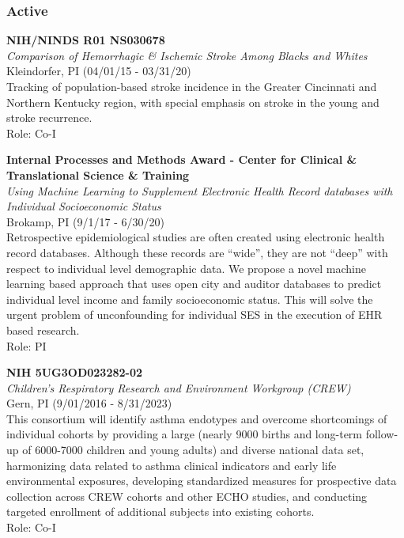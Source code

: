 \hypertarget{active}{%
\subsubsection{Active}\label{active}}

\textbf{NIH/NINDS R01 NS030678}\\
\emph{Comparison of Hemorrhagic \& Ischemic Stroke Among Blacks and
Whites}\\
Kleindorfer, PI (04/01/15 - 03/31/20)\\
Tracking of population-based stroke incidence in the Greater Cincinnati
and Northern Kentucky region, with special emphasis on stroke in the
young and stroke recurrence.\\
Role: Co-I

\textbf{Internal Processes and Methods Award - Center for Clinical \&
Translational Science \& Training}\\
\emph{Using Machine Learning to Supplement Electronic Health Record
databases with Individual Socioeconomic Status}\\
Brokamp, PI (9/1/17 - 6/30/20)\\
Retrospective epidemiological studies are often created using electronic
health record databases. Although these records are ``wide'', they are
not ``deep'' with respect to individual level demographic data. We
propose a novel machine learning based approach that uses open city and
auditor databases to predict individual level income and family
socioeconomic status. This will solve the urgent problem of
unconfounding for individual SES in the execution of EHR based
research.\\
Role: PI

\textbf{NIH 5UG3OD023282-02}\\
\emph{Children's Respiratory Research and Environment Workgroup
(CREW)}\\
Gern, PI (9/01/2016 - 8/31/2023)\\
This consortium will identify asthma endotypes and overcome shortcomings
of individual cohorts by providing a large (nearly 9000 births and
long-term follow-up of 6000-7000 children and young adults) and diverse
national data set, harmonizing data related to asthma clinical
indicators and early life environmental exposures, developing
standardized measures for prospective data collection across CREW
cohorts and other ECHO studies, and conducting targeted enrollment of
additional subjects into existing cohorts.\\
Role: Co-I

